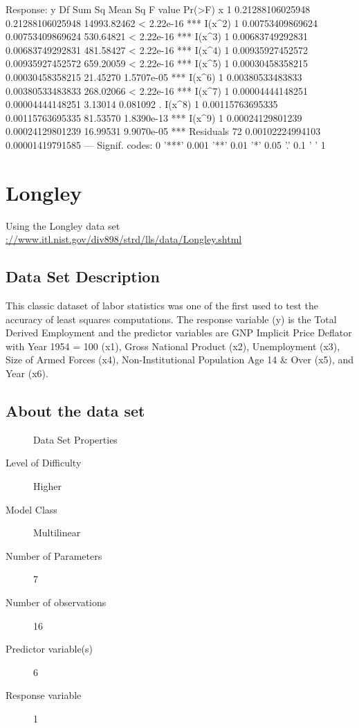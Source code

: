\documentclass[10pt]{article}
\begin{document}
\begin{Schunk}
\begin{Soutput}
Response: y
          Df           Sum Sq          Mean Sq     F value     Pr(>F)    
x          1 0.21288106025948 0.21288106025948 14993.82462 < 2.22e-16 ***
I(x^2)     1 0.00753409869624 0.00753409869624   530.64821 < 2.22e-16 ***
I(x^3)     1 0.00683749292831 0.00683749292831   481.58427 < 2.22e-16 ***
I(x^4)     1 0.00935927452572 0.00935927452572   659.20059 < 2.22e-16 ***
I(x^5)     1 0.00030458358215 0.00030458358215    21.45270 1.5707e-05 ***
I(x^6)     1 0.00380533483833 0.00380533483833   268.02066 < 2.22e-16 ***
I(x^7)     1 0.00004444148251 0.00004444148251     3.13014   0.081092 .  
I(x^8)     1 0.00115763695335 0.00115763695335    81.53570 1.8390e-13 ***
I(x^9)     1 0.00024129801239 0.00024129801239    16.99531 9.9070e-05 ***
Residuals 72 0.00102224994103 0.00001419791585                           
---
Signif. codes:  0 '***' 0.001 '**' 0.01 '*' 0.05 '.' 0.1 ' ' 1
\end{Soutput}
\end{Schunk}



\section{Longley}
Using the Longley data set \url{://www.itl.nist.gov/div898/strd/lls/data/Longley.shtml}

\subsection*{Data Set Description}
This classic dataset of labor statistics was one of the first used to test the 
accuracy of least squares computations. The response variable (y) is the 
Total Derived Employment and the predictor variables are GNP Implicit Price Deflator 
with Year 1954 = 100 (x1), Gross National Product (x2), Unemployment (x3), 
Size of Armed Forces (x4), Non-Institutional Population Age 14 \& Over (x5), 
and Year (x6).


\subsection*{About the data set}

\begin{description}
   \item[]Data Set Properties
   \item[Level of Difficulty] Higher
   \item[Model Class] Multilinear
   \item[Number of Parameters] 7
   \item[Number of observations] 16
   \item[Predictor variable(s)] 6
   \item[Response variable] 1
\end{description}
\end{document}

